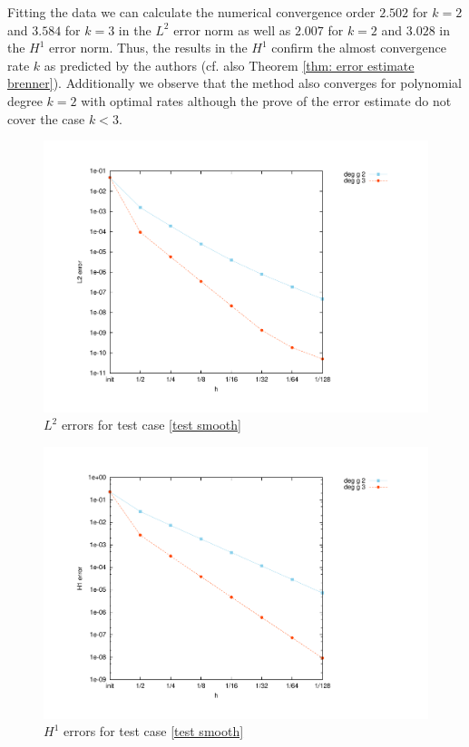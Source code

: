 Fitting the data we can calculate the numerical convergence order $2.502$ for $k=2$ and $3.584$ for $k=3$ in the $L^2$ error norm as well as $2.007$ for $k=2$ and $3.028$ in the $H^1$ error norm. Thus, the results in the $H^1$ confirm the almost convergence rate $k$ as predicted by the authors (cf. also Theorem \ref{thm: error estimate brenner}).
Additionally we observe that the method also converges for polynomial degree $k=2$ with optimal rates although the prove of the error estimate do not cover the case $k<3$.

\begin{figure}[H]
\centering
	\includegraphics[scale=0.45]{plots/MA1_Brenner_l2.pdf}
	\caption{$L^2$ errors for test case \ref{test smooth}}
	\label{fig: Brenner test1}
\end{figure}
\begin{figure}[H]
	\centering
	\includegraphics[scale=0.45]{plots/MA1_Brenner_h1.pdf}
	\caption{$H^1$ errors for test case \ref{test smooth}}
	\label{fig: Brenner test1 h1}
\end{figure}

